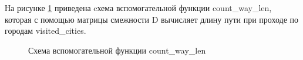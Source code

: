 \clearpage
На рисунке \ref{fig:count_len} приведена cхема вспомогательной функции count\_way\_len, которая с помощью матрицы смежности D вычисляет длину пути при проходе по городам visited\_cities.


\begin{figure}[h!]
	
	
	\caption{Схема вспомогательной функции count\_way\_len}
	
	\label{fig:count_len}
	
\end{figure}

